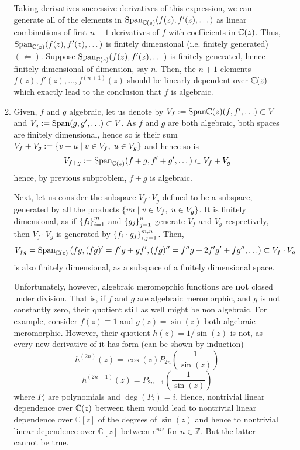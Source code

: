 \documentclass[8pt]{article} %
\begin{document}
\begin{enumerate}[label=\bfseries Problem \arabic*.]
\begin{enumerate}[label=(\arabic*).]
				Taking derivatives successive derivatives of this expression, we can generate all of the elements in
				$\mbox{Span}_{\mathbb{C}(z)}(f(z),f'(z),\dots)$ as linear combinations of first $n-1$ derivatives of $f$ with coefficients
				in $\mathbb{C}(z)$. Thus, $\mbox{Span}_{\mathbb{C}(z)}(f(z),f'(z),\dots)$ is finitely dimensional (i.e. finitely generated)
				$(\Leftarrow)$. Suppose $\mbox{Span}_{\mathbb{C}(z)}(f(z),f'(z),\dots)$ is finitely generated, hence finitely dimensional
				of dimension, say $n$. Then, the $n+1$ elements $f(z),f'(z),\hdots,f^{(n+1)}(z)$ should be linearly dependent
				over $\mathbb{C}(z)$ which exactly lead to the conclusion that $f$ is algebraic.
			\item Given, $f$ and $g$ algebraic, let us denote by $V_f:=\mbox{Span}{\mathbb{C}(z)}(f,f',\hdots)\subset V$ and 
				$V_g:=\mbox{Span}(g,g',\hdots)\subset V$. As $f$ and $g$ are both algebraic, both spaces are finitely dimensional,
				hence so is their sum $V_f+V_g:=\left\{v+u\mid v\in V_f,\;u\in V_g\right\}$ and hence so is
				\[V_{f+g}:=\mbox{Span}_{\mathbb{C}(z)}(f+g,f'+g',\dots)\subset V_f+V_g\]
				hence, by previous subproblem, $f+g$ is algebraic.

				Next, let us consider the subspace $V_f\cdot V_g$ defined to be a subspace, generated by all the products
				$\left\{vu\mid v\in V_f,\;u\in V_g\right\}$. It is finitely dimensional, as if $\left\{f_i\right\}_{i=1}^m$ and
				$\left\{g_j\right\}_{j=1}^n$ generate $V_f$ and $V_g$ respectively, then $V_f\cdot V_g$ is generated by
				$\left\{f_i\cdot g_j\right\}_{i,j=1}^{m,n}$. Then,
				\[V_{fg}=\mbox{Span}_{\mathbb{C}(z)}\left(fg,(fg)'=f'g+gf',(fg)''=f''g+2f'g'+fg'',\hdots\right)\subset V_f\cdot V_g\]
				is also finitely dimensional, as a subspace of a finitely dimensional space.

				Unfortunately, however, algebraic meromoprhic functions are \textbf{not} closed under division. That is, if
				$f$ and $g$ are algebraic meromorphic, and $g$ is not constantly zero, their quotient still as well might be
				non algebraic. For example, consider $f(z)\equiv 1$ and $g(z)=\sin(z)$ both algebraic meromorphic. However,
				their quotient $h(z)=1/\sin(z)$ is not, as every new derivative of it has form (can be shown by induction)
				\[h^{(2n)}(z)=\cos(z)P_{2n}\left(\frac{1}{\sin(z)}\right)\]
				\[h^{(2n-1)}(z)=P_{2n-1}\left(\frac{1}{\sin(z)}\right)\]
				where $P_i$ are polynomials and $\deg(P_i)=i$.
				Hence, nontrivial linear dependence over $\mathbb{C}(z)$ between them would lead to nontrivial
				linear dependence over $\mathbb{C}[z]$ of the degrees of $\sin(z)$ 
				and hence to nontrivial linear dependence over $\mathbb{C}[z]$ between $e^{niz}$ for $n\in\mathbb{Z}$. But the
				latter cannot be true.
		\end{enumerate}
\end{enumerate}
\end{document}
